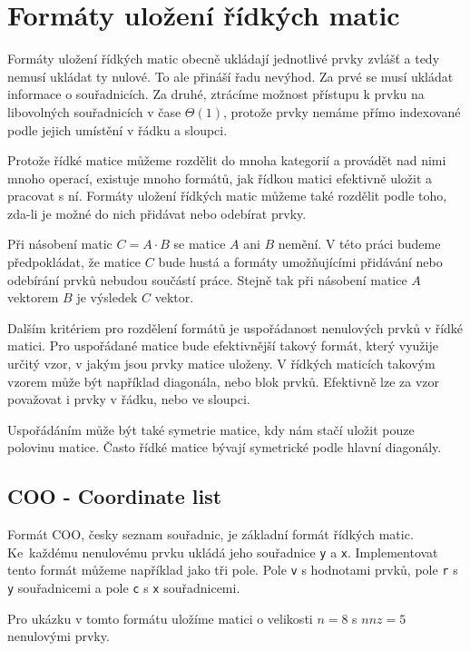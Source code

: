 \chapter{Formáty uložení řídkých matic}


Formáty uložení řídkých matic obecně ukládají jednotlivé prvky zvlášť a tedy nemusí ukládat ty nulové. To ale přináší řadu nevýhod. Za prvé se musí ukládat informace o souřadnicích. Za druhé, ztrácíme možnost přístupu k prvku na libovolných souřadnicích v čase $\Theta(1)$, protože prvky nemáme přímo indexované podle jejich umístění v řádku a sloupci.

Protože řídké matice můžeme rozdělit do mnoha kategorií a provádět nad nimi mnoho operací, existuje mnoho formátů, jak řídkou matici efektivně uložit a pracovat s ní. Formáty uložení řídkých matic můžeme také rozdělit podle toho, zda-li je možné do nich přidávat nebo odebírat prvky.

Při násobení matic $C = A \cdot B$ se matice $A$ ani $B$ nemění. V této práci budeme předpokládat, že matice $C$ bude hustá a formáty umožňujícími přidávání nebo odebírání prvků nebudou součástí práce. Stejně tak při násobení matice $A$ vektorem $B$ je výsledek $C$ vektor.

Dalším kritériem pro rozdělení formátů je uspořádanost nenulových prvků v řídké matici. Pro uspořádané matice bude efektivnější takový formát, který využije určitý vzor, v jakým jsou prvky matice uloženy. V řídkých maticích takovým vzorem může být například diagonála, nebo blok prvků. Efektivně lze za vzor považovat i prvky v řádku, nebo ve sloupci.

Uspořádáním může být také symetrie matice, kdy nám stačí uložit pouze polovinu matice. Často řídké matice bývají symetrické podle hlavní diagonály.

\section{COO - Coordinate list}

Formát COO, česky seznam souřadnic, je základní formát řídkých matic. Ke~každému nenulovému prvku ukládá jeho souřadnice \texttt{y} a \texttt{x}. Implementovat tento formát můžeme například jako tři pole. Pole \texttt{v} s hodnotami prvků, pole \texttt{r} s \texttt{y} souřadnicemi a pole \texttt{c} s \texttt{x} souřadnicemi.

Pro ukázku v tomto formátu uložíme matici o velikosti $n=8$ s $nnz=5$ nenulovými prvky.

